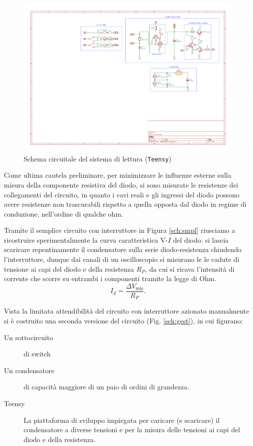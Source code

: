\documentclass{article}[a4paper, oneside, 11pt]
\begin{document}
\begin{figure}[!htb]
	\centering 
 		\includegraphics[scale=2.2]{./measure.pdf}
 	\caption{Schema circuitale del sistema di lettura (\texttt{Teensy})
	\label{sch:rdng}}
\end{figure}
Come ultima cautela preliminare, per minimizzare le influenze esterne sulla
misura della componente resistiva del diodo, si sono misurate le resistenze dei
collegamenti del circuito, in quanto i cavi reali e gli ingressi del diodo
possono avere resistenze non trascurabili rispetto a quella opposta dal diodo
in regime di conduzione, nell'ordine di qualche ohm.

Tramite il semplice circuito con interruttore in Figura \ref{sch:smpl} riusciamo
a ricostruire sperimentalmente la curva caratteristica V-$I$ del diodo: si
lascia scaricare repentinamente il condensatore sulla serie diodo-resistenza
chiudendo l'interruttore, dunque dai canali di un oscilloscopio si misurano le
le cadute di tensione ai capi del diodo e della resistenza $R_P$, da cui si
ricava l'intensità di corrente che scorre su entrambi i componenti tramite la
legge di Ohm.\[
I_d = \frac{\Delta V_{\mathrm{mis}}}{R_P}
.\] 

Vista la limitata attendibilità del circuito con interruttore azionato
manualmente si è costruito una seconda versione del circuito (Fig.
\ref{sch:gest}), in cui figurano: 
\begin{description}
	\item [Un sottocircuito] di switch	
	\item [Un condensatore] di capacità maggiore di un paio di ordini di 
	grandezza.
	\item [Teensy] La piattaforma di sviluppo impiegata per caricare
	(e scaricare) il condensatore a diverse tensioni e per la misura delle
	tensioni ai capi del diodo e della resistenza.
\end{description}
\end{document}
